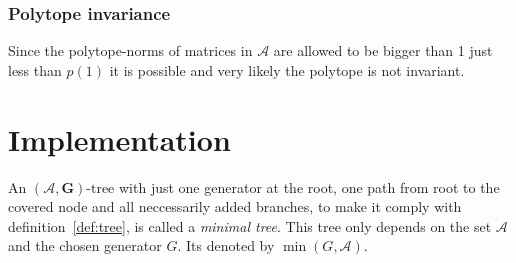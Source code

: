 \subsubsection*{Polytope invariance}
Since the polytope-norms of matrices in $\mathcal{A}$ are allowed to be bigger than 1 just less than $p(1)$ it is possible and very likely the polytope is not invariant.

\section{Implementation}

\begin{definition}
  An $(\mathcal{A},\mathbf{G})\text{-tree}$ with just one generator at the root, one path from root to the covered node and all neccessarily added branches, to make it comply with definition~\ref{def:tree}, is called a \emph{minimal tree}. This tree only depends on the set $\mathcal{A}$ and the chosen generator $G$. Its denoted by $\min(G, \mathcal{A})$.
\end{definition}


